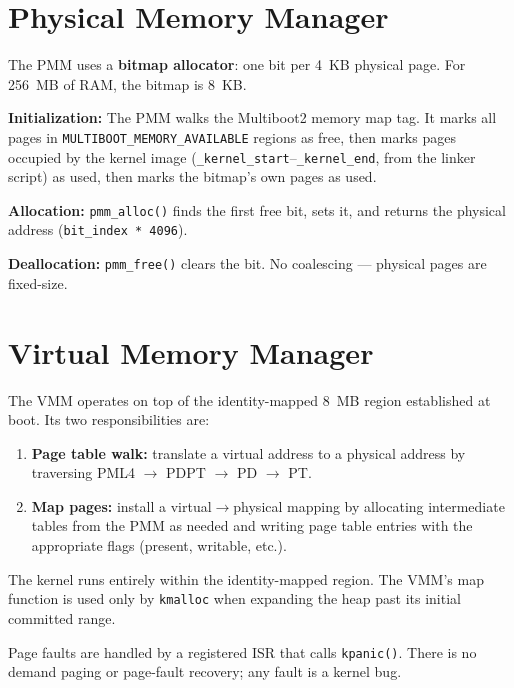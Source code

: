 \documentclass[12pt,a4paper]{article}
\begin{document}
\section{Physical Memory Manager}

The PMM uses a \textbf{bitmap allocator}: one bit per 4~KB physical page. For 256~MB of RAM, the bitmap is 8~KB.

\textbf{Initialization:}
The PMM walks the Multiboot2 memory map tag. It marks all pages in \texttt{MULTIBOOT\_MEMORY\_AVAILABLE} regions as free, then marks pages occupied by the kernel image (\texttt{\_kernel\_start}--\texttt{\_kernel\_end}, from the linker script) as used, then marks the bitmap's own pages as used.

\textbf{Allocation:} \texttt{pmm\_alloc()} finds the first free bit, sets it, and returns the physical address (\texttt{bit\_index * 4096}).

\textbf{Deallocation:} \texttt{pmm\_free()} clears the bit. No coalescing --- physical pages are fixed-size.

\section{Virtual Memory Manager}

The VMM operates on top of the identity-mapped 8~MB region established at boot. Its two responsibilities are:

\begin{enumerate}
    \item \textbf{Page table walk:} translate a virtual address to a physical address by traversing PML4 $\to$ PDPT $\to$ PD $\to$ PT.
    \item \textbf{Map pages:} install a virtual$\to$physical mapping by allocating intermediate tables from the PMM as needed and writing page table entries with the appropriate flags (present, writable, etc.).
\end{enumerate}

The kernel runs entirely within the identity-mapped region. The VMM's map function is used only by \texttt{kmalloc} when expanding the heap past its initial committed range.

Page faults are handled by a registered ISR that calls \texttt{kpanic()}. There is no demand paging or page-fault recovery; any fault is a kernel bug.
\end{document}
